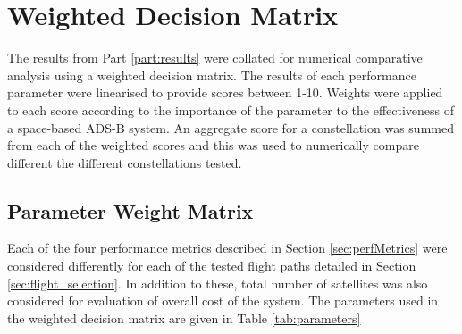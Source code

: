 \section{Weighted Decision Matrix}
\label{sec:decision_matrix}
The results from Part \ref{part:results} were collated for numerical comparative analysis using a weighted decision matrix. The results of each performance parameter were linearised to provide scores between 1-10. Weights were applied to each score according to the importance of the parameter to the effectiveness of a space-based ADS-B system. An aggregate score for a constellation was summed from each of the weighted scores and this was used to numerically compare different the different constellations tested.

\subsection{Parameter Weight Matrix}
Each of the four performance metrics described in Section \ref{sec:perfMetrics} were considered differently for each of the tested flight paths detailed in Section \ref{sec:flight_selection}. In addition to these, total number of satellites was also considered for evaluation of overall cost of the system. The parameters used in the weighted decision matrix are given in Table \ref{tab:parameters}

